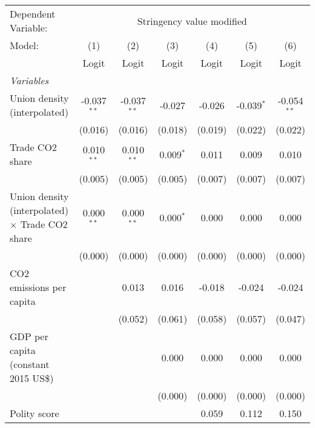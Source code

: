 
\begingroup
\centering
\begin{tabular}{lcccccc}
   \toprule
   Dependent Variable: & \multicolumn{6}{c}{Stringency value modified}\\
   Model:                                                 & (1)           & (2)           & (3)         & (4)     & (5)          & (6)\\  
                                                          &  Logit        & Logit         & Logit       & Logit   & Logit        & Logit\\  
   \midrule
   \emph{Variables}\\
   Union density (interpolated)                           & -0.037$^{**}$ & -0.037$^{**}$ & -0.027      & -0.026  & -0.039$^{*}$ & -0.054$^{**}$\\   
                                                          & (0.016)       & (0.016)       & (0.018)     & (0.019) & (0.022)      & (0.022)\\   
   Trade CO2 share                                        & 0.010$^{**}$  & 0.010$^{**}$  & 0.009$^{*}$ & 0.011   & 0.009        & 0.010\\   
                                                          & (0.005)       & (0.005)       & (0.005)     & (0.007) & (0.007)      & (0.007)\\   
   Union density (interpolated) $\times$ Trade CO2 share  & 0.000$^{**}$  & 0.000$^{**}$  & 0.000$^{*}$ & 0.000   & 0.000        & 0.000\\   
                                                          & (0.000)       & (0.000)       & (0.000)     & (0.000) & (0.000)      & (0.000)\\   
   CO2 emissions per capita                               &               & 0.013         & 0.016       & -0.018  & -0.024       & -0.024\\   
                                                          &               & (0.052)       & (0.061)     & (0.058) & (0.057)      & (0.047)\\   
   GDP per capita (constant 2015 US\$)                    &               &               & 0.000       & 0.000   & 0.000        & 0.000\\   
                                                          &               &               & (0.000)     & (0.000) & (0.000)      & (0.000)\\   
   Polity score                                           &               &               &             & 0.059   & 0.112        & 0.150\\   

\end{tabular}
